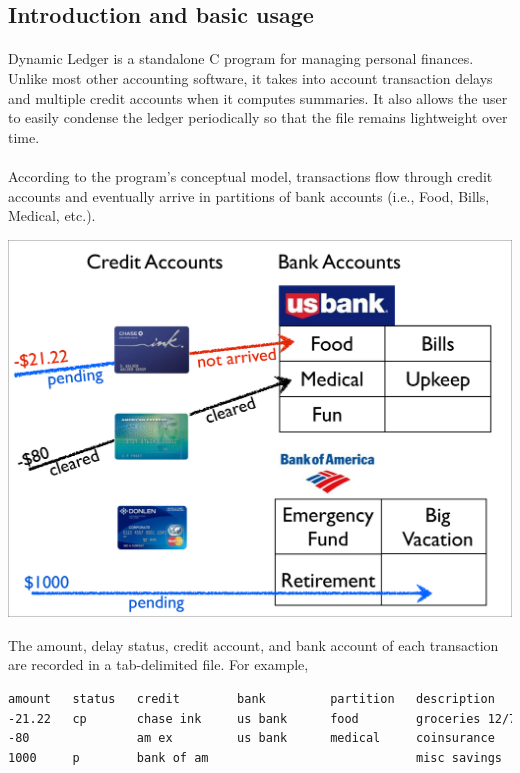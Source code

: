 \documentclass{article}
\providecommand{\q}{$\quad$ \newline}
\begin{document}
\begin{flushleft}

\section{Introduction and basic usage}

\paragraph{} Dynamic Ledger is a standalone C program for managing personal finances. Unlike most other accounting software, it takes into account transaction delays and multiple credit accounts when it computes summaries. It also allows the user to easily condense the ledger periodically so that the file remains lightweight over time.

\paragraph{} According to the program's conceptual model, transactions flow through credit accounts and eventually arrive in partitions of bank accounts (i.e., Food, Bills, Medical, etc.). \q

\begin{center}
\includegraphics[scale=.4]{fig/model}
\end{center}

The amount, delay status, credit account, and bank account of each transaction are recorded in a tab-delimited file. For example, 

\begin{lstlisting}[language=bash, title=example\_ledger1.txt]
amount   status   credit        bank         partition   description
-21.22   cp       chase ink     us bank      food        groceries 12/7/13
-80               am ex         us bank      medical     coinsurance 
1000     p        bank of am                             misc savings
\end{lstlisting}  \q


\end{flushleft}
\end{document}
